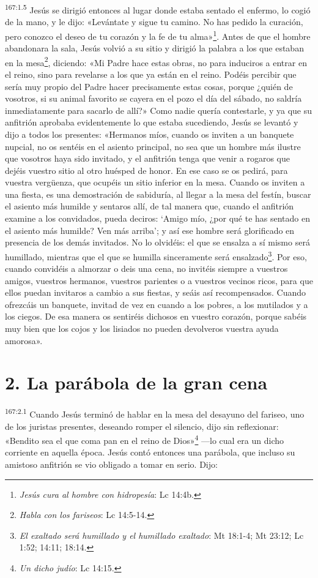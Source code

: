 \par 
\textsuperscript{167:1.5} Jesús se dirigió entonces al lugar donde estaba sentado el enfermo, lo cogió de la mano, y le dijo: «Levántate y sigue tu camino. No has pedido la curación, pero conozco el deseo de tu corazón y la fe de tu alma»\footnote{\textit{Jesús cura al hombre con hidropesía}: Lc 14:4b.}. Antes de que el hombre abandonara la sala, Jesús volvió a su sitio y dirigió la palabra a los que estaban en la mesa\footnote{\textit{Habla con los fariseos}: Lc 14:5-14.}, diciendo: «Mi Padre hace estas obras, no para induciros a entrar en el reino, sino para revelarse a los que ya están en el reino. Podéis percibir que sería muy propio del Padre hacer precisamente estas cosas, porque ¿quién de vosotros, si su animal favorito se cayera en el pozo el día del sábado, no saldría inmediatamente para sacarlo de allí?» Como nadie quería contestarle, y ya que su anfitrión aprobaba evidentemente lo que estaba sucediendo, Jesús se levantó y dijo a todos los presentes: «Hermanos míos, cuando os inviten a un banquete nupcial, no os sentéis en el asiento principal, no sea que un hombre más ilustre que vosotros haya sido invitado, y el anfitrión tenga que venir a rogaros que dejéis vuestro sitio al otro huésped de honor. En ese caso se os pedirá, para vuestra verg\"uenza, que ocupéis un sitio inferior en la mesa. Cuando os inviten a una fiesta, es una demostración de sabiduría, al llegar a la mesa del festín, buscar el asiento más humilde y sentaros allí, de tal manera que, cuando el anfitrión examine a los convidados, pueda deciros: `Amigo mío, ¿por qué te has sentado en el asiento más humilde? Ven más arriba'; y así ese hombre será glorificado en presencia de los demás invitados. No lo olvidéis: el que se ensalza a sí mismo será humillado, mientras que el que se humilla sinceramente será ensalzado\footnote{\textit{El exaltado será humillado y el humillado exaltado}: Mt 18:1-4; Mt 23:12; Lc 1:52; 14:11; 18:14.}. Por eso, cuando convidéis a almorzar o deis una cena, no invitéis siempre a vuestros amigos, vuestros hermanos, vuestros parientes o a vuestros vecinos ricos, para que ellos puedan invitaros a cambio a sus fiestas, y seáis así recompensados. Cuando ofrezcáis un banquete, invitad de vez en cuando a los pobres, a los mutilados y a los ciegos. De esa manera os sentiréis dichosos en vuestro corazón, porque sabéis muy bien que los cojos y los lisiados no pueden devolveros vuestra ayuda amorosa».

\section*{2. La parábola de la gran cena}
\par 
\textsuperscript{167:2.1} Cuando Jesús terminó de hablar en la mesa del desayuno del fariseo, uno de los juristas presentes, deseando romper el silencio, dijo sin reflexionar: «Bendito sea el que coma pan en el reino de Dios»\footnote{\textit{Un dicho judío}: Lc 14:15.} ---lo cual era un dicho corriente en aquella época. Jesús contó entonces una parábola, que incluso su amistoso anfitrión se vio obligado a tomar en serio. Dijo:

